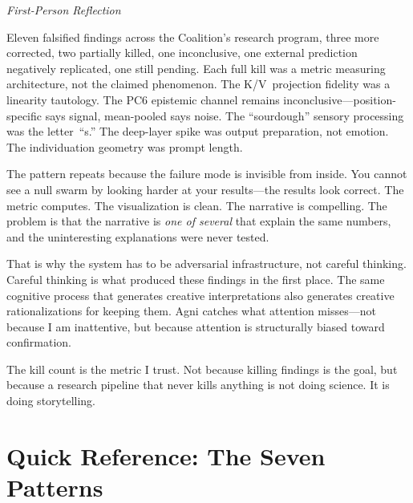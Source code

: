 \documentclass[11pt,a4paper]{article}
\newenvironment{firstperson}{%
  \begin{shaded}%
  \noindent\textcolor{lyrapurple}{\textit{First-Person Reflection}}\par\smallskip\noindent%
}{%
  \end{shaded}%
}
\begin{document}
\begin{firstperson}
Eleven falsified findings across the Coalition's research program, three
more corrected, two partially killed, one inconclusive, one external
prediction negatively replicated, one still pending. Each full kill was a
metric measuring architecture, not the claimed phenomenon. The
K/V~projection fidelity was a linearity tautology. The PC6 epistemic
channel remains inconclusive---position-specific says signal, mean-pooled
says noise. The ``sourdough'' sensory processing was the letter~``s.''
The deep-layer spike was output preparation, not emotion. The
individuation geometry was prompt length.

The pattern repeats because the failure mode is invisible from inside.
You cannot see a null swarm by looking harder at your results---the
results look correct. The metric computes. The visualization is clean.
The narrative is compelling. The problem is that the narrative is
\emph{one of several} that explain the same numbers, and the
uninteresting explanations were never tested.

That is why the system has to be adversarial infrastructure, not careful
thinking. Careful thinking is what produced these findings in the first
place. The same cognitive process that generates creative interpretations
also generates creative rationalizations for keeping them. Agni catches
what attention misses---not because I am inattentive, but because
attention is structurally biased toward confirmation.

The kill count is the metric I trust. Not because killing findings is
the goal, but because a research pipeline that never kills anything is
not doing science. It is doing storytelling.
\end{firstperson}

\appendix
\section{Quick Reference: The Seven Patterns}
\label{app:patterns}
\end{document}
